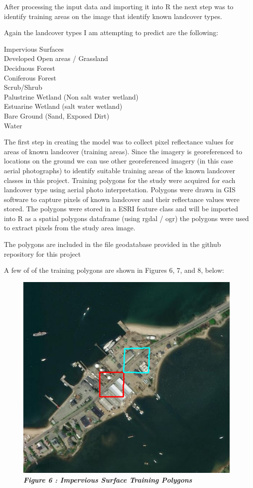 \documentclass[]{article}
\begin{document}
After processing the input data and importing it into R the next step
was to identify training areas on the image that identify known
landcover types.

Again the landcover types I am attempting to predict are the following:

Impervious Surfaces\\
Developed Open areas / Grassland\\
Deciduous Forest\\
Coniferous Forest\\
Scrub/Shrub\\
Palustrine Wetland (Non salt water wetland)\\
Estuarine Wetland (salt water wetland)\\
Bare Ground (Sand, Exposed Dirt)\\
Water

The first step in creating the model was to collect pixel reflectance
values for areas of known landcover (training areas). Since the imagery
is georeferenced to locations on the ground we can use other
georeferenced imagery (in this case aerial photographs) to identify
suitable training areas of the known landcover classes in this project.
Training polygons for the study were acquired for each landcover type
using aerial photo interpretation. Polygons were drawn in GIS software
to capture pixels of known landcover and their reflectance values were
stored. The polygons were stored in a ESRI feature class and will be
imported into R as a spatial polygons dataframe (using rgdal / ogr) the
polygons were used to extract pixels from the study area image.

The polygons are included in the file geodatabase provided in the github
repository for this project

A few of of the training polygons are shown in Figures 6, 7, and 8,
below:

\begin{figure}
\centering
\includegraphics{images/ImpTA.png}
\caption{\textbf{\emph{Figure 6 : Impervious Surface Training
Polygons}}}
\end{figure}
\end{document}
